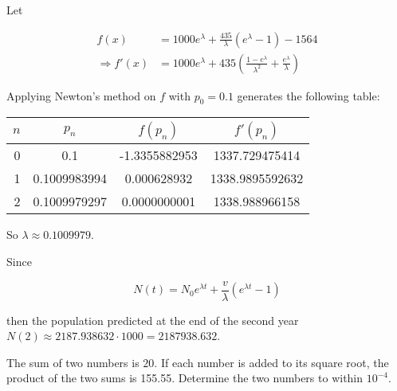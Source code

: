\documentclass[../../../../Assignments]{subfiles}
\begin{document}
\begin{solution}
    Let

    \begin{align*}
                     f(x) &= \num{1000} e^\lambda + \frac{\num{435}}{\lambda} (e^\lambda - 1) - \num{1564} \\
        \Rightarrow f'(x) &= \num{1000} e^\lambda + \num{435} \left(\frac{1 - e^\lambda}{\lambda^2} + \frac{e^\lambda}{\lambda}\right)
    \end{align*}

    Applying Newton's method on \(f\) with \(p_0 = \num{0.1}\) generates the
    following table:

    \begin{table}[H]
        \centering
        \begin{tabular}{r S[table-format=1.10] S[table-format=-1.10] S[table-format=4.10]}
            \toprule
            \(n\)  &    {\(p_n\)}   &   {\(f(p_n)\)}  &   {\(f'(p_n)\)}   \\
              &  0.1           &  -1.3355882953  &  1337.729475414   \\
                1  &  0.1009983994  &   0.000628932   &  1338.9895592632  \\
                2  &  0.1009979297  &   0.0000000001  &  1338.988966158   \\
            \bottomrule
        \end{tabular}
    \end{table}

    So \(\lambda \approx \num{0.1009979}\).

    Since

    \[N(t) = N_0 e^{\lambda t} + \frac{v}{\lambda} (e^{\lambda t} - 1)\]

    \noindent then the population predicted at the end of the second year \(N(2)
    \approx \num{2187.938632} \cdot 1000 = \num{2187938.632}\).
\end{solution}

\begin{exercise}
    The sum of two numbers is \(20\). If each number is added to its square
    root, the product of the two sums is \num{155.55}. Determine the two numbers
    to within \(10^{-4}\).
\end{exercise}
\end{document}
